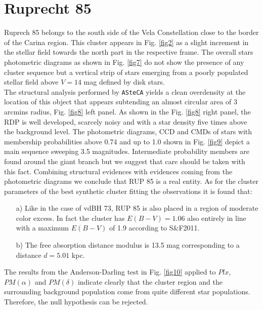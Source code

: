 \documentclass[draft]{aa}
\begin{document}
\section{Ruprecht 85}

Ruprech 85 belongs to the south side of the Vela Constellation close to the
border of the Carina region. This cluster appears in Fig. \ref{fig2} as a slight
increment in the stellar field towards the north part in the respective frame.
The overall stars photometric diagrams as shown in Fig. \ref{fig7} do not show
the presence of any cluster sequence but a vertical strip of stars emerging from
a poorly populated stellar field above $V= 14$ mag defined by disk stars.\\

The structural analysis performed by \texttt{ASteCA} yields a clean overdensity
at the location of this object that appears subtending an almost circular area
of 3 arcmins radius, Fig. \ref{fig8} left panel. As shown in the Fig. \ref{fig8}
right panel, the RDP is well developed, scarcely noisy and with a star density
five times above the background level. The photometric diagrams, CCD and CMDs of
stars with membership probabilities above 0.74 and up to 1.0 shown in Fig.
\ref{fig9} depict a main sequence sweeping 3.5 magnitudes. Intermediate
probability members are found around the giant branch but we suggest that
care should be taken with this fact. Combining structural evidences with
evidences coming from the photometric diagrams we conclude that RUP 85 is a
real entity. As for the cluster parameters of the best synthetic cluster
fitting the observations it is found that:

\begin{itemize}
\item [a)] Like in the case of vdBH 73, RUP 85 is also placed
    in a region of moderate color excess. In fact the cluster has $E(B-V) =
    1.06$ also entirely in line with a maximum $E(B-V)$ of 1.9 according to 
    S\&F2011.
\item [b)] The free absorption distance modulus is 13.5 mag corresponding to a
    distance $d=5.01$ kpc.
\end{itemize}

The results from the Anderson-Darling test in Fig. \ref{fig10} applied to $Plx$,
$PM(\alpha)$ and $PM(\delta)$ indicate clearly that the cluster region and the
surrounding background population come from quite different star populations.
Therefore, the null hypothesis can be rejected.\\
\end{document}
